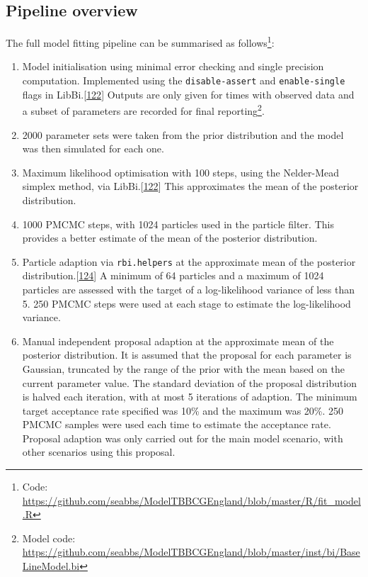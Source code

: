 \documentclass[11pt,twoside]{bristolthesis}
\begin{document}
  \hypertarget{pipeline-overview}{%
  \subsection{Pipeline overview}\label{pipeline-overview}}
  
  The full model fitting pipeline can be summarised as follows\footnote{Code: \url{https://github.com/seabbs/ModelTBBCGEngland/blob/master/R/fit_model.R}}:
  \begin{enumerate}
  \def\labelenumi{\arabic{enumi}.}
  \item
    Model initialisation using minimal error checking and single precision computation. Implemented using the \texttt{disable-assert} and \texttt{enable-single} flags in LibBi.{[}\protect\hyperlink{ref-Murray2015}{122}{]} Outputs are only given for times with observed data and a subset of parameters are recorded for final reporting\footnote{Model code: \url{https://github.com/seabbs/ModelTBBCGEngland/blob/master/inst/bi/BaseLineModel.bi}}.
  \item
    2000 parameter sets were taken from the prior distribution and the model was then simulated for each one.
  \item
    Maximum likelihood optimisation with 100 steps, using the Nelder-Mead simplex method, via LibBi.{[}\protect\hyperlink{ref-Murray2015}{122}{]} This approximates the mean of the posterior distribution.
  \item
    1000 PMCMC steps, with 1024 particles used in the particle filter. This provides a better estimate of the mean of the posterior distribution.
  \item
    Particle adaption via \texttt{rbi.helpers} at the approximate mean of the posterior distribution.{[}\protect\hyperlink{ref-Funk:2019uw}{124}{]} A minimum of 64 particles and a maximum of 1024 particles are assessed with the target of a log-likelihood variance of less than 5. 250 PMCMC steps were used at each stage to estimate the log-likelihood variance.
  \item
    Manual independent proposal adaption at the approximate mean of the posterior distribution. It is assumed that the proposal for each parameter is Gaussian, truncated by the range of the prior with the mean based on the current parameter value. The standard deviation of the proposal distribution is halved each iteration, with at most 5 iterations of adaption. The minimum target acceptance rate specified was 10\% and the maximum was 20\%. 250 PMCMC samples were used each time to estimate the acceptance rate. Proposal adaption was only carried out for the main model scenario, with other scenarios using this proposal.

\end{enumerate}
\end{document}
